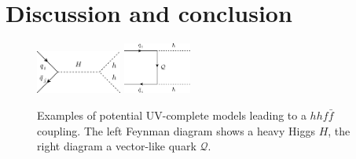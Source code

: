 \section{Discussion and conclusion \label{sec:concly}}
\begin{figure}[!t]
	\centering
	\includegraphics[width = 0.25\textwidth]{./fig/qqh_2hdm}
	\hspace{0.5 cm}
	\includegraphics[width = 0.2\textwidth]{./fig/VLQ}
	\caption{Examples of potential UV-complete models leading to a  $hh f \bar{f} $ coupling. The left Feynman diagram shows a heavy Higgs $H$, the right diagram a vector-like quark $\mathcal Q $.} %
	\label{fig_uv_qqhh}
\end{figure}

